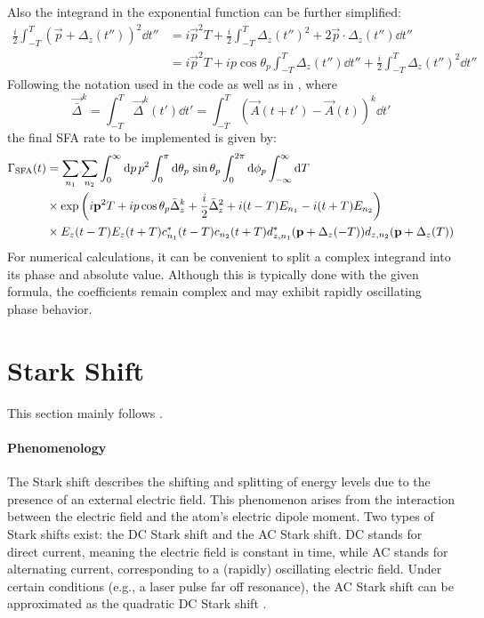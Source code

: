 Also the integrand in the exponential function can be further simplified:
\begin{align*}
    \frac{i}{2}\int_{-T}^{T}(\vec{p}+\Delta_z(t''))^2\dd t'' &= i\vec{p}^2T + \frac{i}{2}\int_{-T}^{T}\Delta_z(t'')^2+2\vec{p}\cdot\Delta_z(t'')\dd t'' \\
    &= i\vec{p}^2T + ip\cos\theta_p\int_{-T}^{T}\Delta_z(t'')\dd t'' +  \frac{i}{2}\int_{-T}^{T}\Delta_z(t'')^2\dd t''
\end{align*}
Following the notation used in the code as well as in \cite{Theory_NPS}, where
\begin{equation*}
    \vec{\bar{\Delta}}^k = \int_{-T}^{T}\vec{\Delta}^k(t')\dd t' = \int_{-T}^{T}\left(\vec{A}(t+t') - \vec{A}(t)\right)^k\dd t'
\end{equation*}
the final SFA rate to be implemented is given by:
\begin{align}
    \Gamma_{\mathrm{SFA}}(t) &= \sum_{n_1}\sum_{n_2} \int_0^{\infty} \mathrm{d} p\,p^2\int_0^{\pi} \mathrm{d}\theta_p\,\sin\theta_p \int_0^{2\pi}\mathrm{d} \phi_p\int_{-\infty}^{\infty} \mathrm{d} T\notag\\
    &\times \exp\left(i\mathbf{p}^2T + ip\cos\theta_p\bar{\Delta}_z^k +  \frac{i}{2}\bar{\Delta}_z^2  + i(t-T)E_{n_1}-i(t+T)E_{n_2}\right)\notag\\
    &\times E_z(t-T) E_z(t+T)c_{n_1}^*(t-T)c_{n_2}(t+T) d_{z,n_1}^*(\mathbf{p}+\Delta_z(-T))d_{z,n_2}(\mathbf{p}+\Delta_z(T))
    \label{eq:sfa_rate_improved}
\end{align}
For numerical calculations, it can be convenient to split a complex integrand into its phase and absolute value.
Although this is typically done with the given formula, the coefficients remain complex and may exhibit rapidly oscillating phase behavior.





\section{Stark Shift}
\label{sec:starkdistortion}
This section mainly follows \cite{subsycleacstarkshift, starkdelonekrainov}.
\paragraph{Phenomenology}
The Stark shift describes the shifting and splitting of energy levels due to the presence of an external electric field.
This phenomenon arises from the interaction between the electric field and the atom's electric dipole moment.
Two types of Stark shifts exist: the DC Stark shift and the AC Stark shift.
DC stands for direct current, meaning the electric field is constant in time, while AC stands for alternating current, corresponding to a (rapidly) oscillating electric field.
Under certain conditions (e.g., a laser pulse far off resonance), the AC Stark shift can be approximated as the quadratic DC Stark shift \cite{starkdelonekrainov}.

